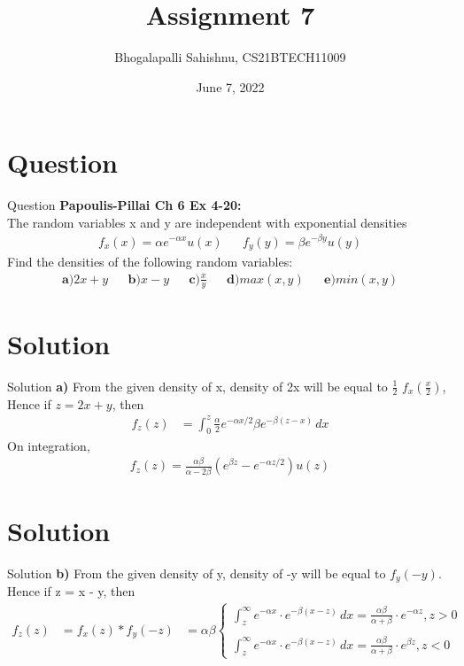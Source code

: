 \documentclass{beamer}
\title{Assignment 7}
\author{Bhogalapalli Sahishnu, CS21BTECH11009}
\date{June 7, 2022}
\begin{document}
\begin{frame}
    \titlepage
\end{frame}

\section{Question}
\begin{frame}{Question}
\textbf{Papoulis-Pillai Ch 6 Ex 4-20: }\\
The random variables x and y are independent with exponential densities
\begin{align}
    f_x(x) = \alpha e^{-\alpha x} u(x) && f_y(y) = \beta e^{-\beta y} u(y)
\end{align}
Find the densities of the following random variables:
\begin{align*}
    \textbf{a)} 2x + y && \textbf{b)} x - y && \textbf{c)} \frac{x}{y} && \textbf{d)} max(x,y) && \textbf{e)} min(x,y)
\end{align*}
\end{frame}

\section{Solution}
\begin{frame}{Solution}
\textbf{a)} From the given density of x, density of 2x will be equal to $\frac{1}{2}$ $f_x(\frac{x}{2})$, Hence if $z = 2x + y$, then
\begin{align*}
    f_z(z) &= \int_{0}^{z} \frac{\alpha}{2} e^{-\alpha x/2} \beta e^{-\beta (z-x)} \,dx
\end{align*}
On integration,
\begin{align*}
    f_z(z) = \frac{\alpha \beta}{\alpha - 2\beta} (e^{\beta z} - e^{-\alpha z/2}) u(z)
\end{align*}
\end{frame}

\section{Solution}
\begin{frame}{Solution}
\textbf{b)} From the given density of y, density of -y will be equal to $f_y(-y)$. Hence if z = x - y, then 
\begin{align*}
    f_z(z) &= f_x(z)*f_y(-z)
           &= \alpha \beta    
           \begin{cases}
                \int_{z}^{\infty} e^{-\alpha x} \cdot e^{-\beta(x - z)} \, dx = \frac{\alpha \beta}{\alpha + \beta} \cdot e^{-\alpha z}, z > 0\\\\
                \int_{z}^{\infty} e^{-\alpha x} \cdot e^{-\beta(x - z)} \, dx = \frac{\alpha \beta}{\alpha + \beta} \cdot e^{\beta z}, z < 0
           \end{cases}
\end{align*}
    
\end{frame}
\end{document}
